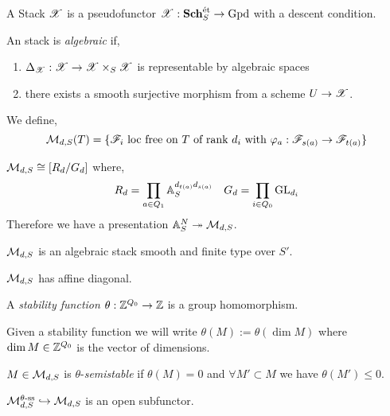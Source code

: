 \documentclass[12pt]{article}
\begin{document}
A Stack $\mathscr{X}$ is a pseudofunctor $\mathscr{X} : \mathbf{Sch}_S^{\text{\'{e}t}} \to \mathrm{Gpd}$ with a descent condition.

\begin{defn}
An stack is \textit{algebraic} if,
\begin{enumerate}
\item $\Delta_{\mathscr{X}} : \mathscr{X} \to \mathscr{X} \times_S \mathscr{X}$ is representable by algebraic spaces
\item there exists a smooth surjective morphism from a scheme $U \to \mathscr{X}$.
\end{enumerate}
\end{defn}

\begin{defn}
We define,
\[ \mathcal{M}_{d,S}(T) = \{ \mathscr{F}_i \text{ loc free on } T \text{ of rank } d_i \text{ with } \varphi_a : \mathscr{F}_{s(a)} \to \mathscr{F}_{t(a)} \} \]
\end{defn}

\begin{prop}
$\mathcal{M}_{d,S} \cong [R_d / G_d]$ where,
\[ R_d = \prod_{a \in Q_1} \mathbb{A}_S^{d_{t(a)} d_{s(a)}} \quad G_d = \prod_{i \in Q_0} \mathrm{GL}_{d_i} \]
Therefore we have a presentation $\mathbb{A}_S^N \twoheadrightarrow \mathcal{M}_{d,S}$. 
\end{prop}

\begin{cor}
$\mathcal{M}_{d,S}$ is an algebraic stack smooth and finite type over $S'$.
\end{cor}

\begin{prop}
$\mathcal{M}_{d, S}$ has affine diagonal.
\end{prop}

\begin{defn}
A \textit{stability function} $\theta  : \mathbb{Z}^{Q_0} \to \mathbb{Z}$ is a group homomorphism.
\end{defn}

\begin{rmk}
Given a stability function we will write $\theta(M) := \theta(\dim{M})$ where $\dim{M} \in \mathbb{Z}^{Q_0}$ is the vector of dimensions.
\end{rmk}

\begin{defn}
$M \in \mathcal{M}_{d,S}$ is $\theta$-\textit{semistable} if $\theta(M) = 0$ and $\forall M' \subset M$ we have $\theta(M') \le 0$.
\end{defn}

\begin{prop}
$\mathcal{M}_{d,S}^{\theta\text{-ss}} \hookrightarrow \mathcal{M}_{d,S}$ is an open subfunctor. 
\end{prop}
\end{document}
